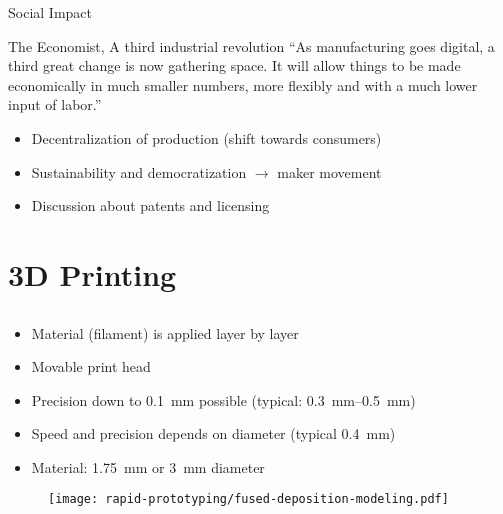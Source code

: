 \documentclass[aspectratio=169]{beamer}
\begin{document}
\begin{frame}{Social Impact}
    \begin{block}{The Economist, A third industrial revolution}
        ``As manufacturing goes digital, a third great change is now gathering space.
        It will allow things to be made economically in much smaller numbers, more flexibly and with a much lower input of labor.''
    \end{block}
    \begin{itemize}
        \item Decentralization of production (shift towards consumers)
        \item Sustainability and democratization $\rightarrow$ maker movement
        \item Discussion about patents and licensing
    \end{itemize}
\end{frame}

\section{3D Printing}
\subsection{}
\begin{frame}
    \begin{itemize}
        \item Material (filament) is applied layer by layer
        \item Movable print head
        \item Precision down to \SI{0.1}{\milli\meter} possible (typical: \SIrange{0.3}{0.5}{\milli\meter})
        \item Speed and precision depends on diameter (typical \SI{0.4}{\milli\meter})
        \item Material: \SI{1.75}{\milli\meter} or \SI{3}{\milli\meter} diameter
    \end{itemize}
\end{frame}

\begin{frame}
    \begin{figure}
        \texttt{[image: rapid-prototyping/fused-deposition-modeling.pdf]}
        \caption{}
    \end{figure}
\end{frame}
\end{document}
